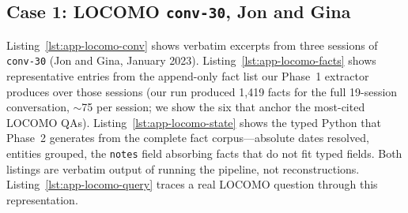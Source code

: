 \subsection{Case 1: LOCOMO \texttt{conv-30}, Jon and Gina}

Listing~\ref{lst:app-locomo-conv} shows verbatim excerpts from three sessions of \texttt{conv-30} (Jon and Gina, January 2023). Listing~\ref{lst:app-locomo-facts} shows representative entries from the append-only fact list our Phase~1 extractor produces over those sessions (our run produced 1{,}419 facts for the full 19-session conversation, $\sim$75 per session; we show the six that anchor the most-cited LOCOMO QAs). Listing~\ref{lst:app-locomo-state} shows the typed Python that Phase~2 generates from the complete fact corpus---absolute dates resolved, entities grouped, the \texttt{notes} field absorbing facts that do not fit typed fields. Both listings are verbatim output of running the pipeline, not reconstructions. Listing~\ref{lst:app-locomo-query} traces a real LOCOMO question through this representation.

